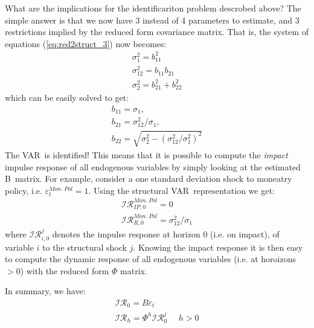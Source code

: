 \documentclass[10pt]{article}
\begin{document}
What are the implications for the identificariton problem descrobed above?
The simple answer is that we now have 3 instead of 4 parameters to estimate,
and 3 restrictions implied by the reduced form covariance matrix. That is,
the system of equations (\ref{eq:red2struct_3}) now becomes:%
\begin{equation}
\begin{array}{l}
\sigma _{1}^{2}=b_{11}^{2} \\ 
\sigma _{12}^{2}=b_{11}b_{21} \\ 
\sigma _{2}^{2}=b_{21}^{2}+b_{22}^{2}%
\end{array}
\label{eq:red2struct_4}
\end{equation}%
which can be easily solved to get:%
\begin{equation*}
\begin{array}{c}
b_{11}=\sigma _{1}, \\ 
b_{21}=\sigma _{12}^{2}/\sigma _{1}, \\ 
b_{22}=\sqrt{\sigma _{2}^{2}-\left( \sigma _{12}^{2}/\sigma _{1}^{2}\right)
^{2}}%
\end{array}%
\end{equation*}%
The VAR\ is identified! This means that it is possible to compute the \emph{%
impact} impulse response of all endogenous variables by simply looking at
the estimated B\ matrix. For example, consider a one standard deviation
shock to moneatry policy, i.e. $\varepsilon _{t}^{Mon.\ Pol}=1$. Using the
structural VAR\ representation we get:%
\begin{equation}
\begin{array}{l}
\mathcal{IR}_{IP,0}^{Mon.\ Pol}=0 \\ 
\mathcal{IR}_{R,0}^{Mon.\ Pol}=\sigma _{12}^{2}/\sigma _{1}%
\end{array}
\label{eq:IR_example}
\end{equation}%
where $\mathcal{IR}_{i,0}^{j}$ denotes the impulse response at horizon $0$
(i.e. on impact), of variable $i$ to the structural shock $j$. Knowing the
impact response it is then easy to compute the dynamic response of all
endogenous variables (i.e. at horoizons $>0$) with the reduced form $\Phi $
matrix. 

In summary, we have:%
\begin{equation}
\begin{array}{l}
\mathcal{IR}_{0}=B\varepsilon _{t} \\ 
\mathcal{IR}_{h}=\Phi ^{h}\mathcal{IR}_{0}^{j}\ \ \ \ \ \ h>0%
\end{array}
\label{eq:IR_recusive}
\end{equation}
\end{document}
